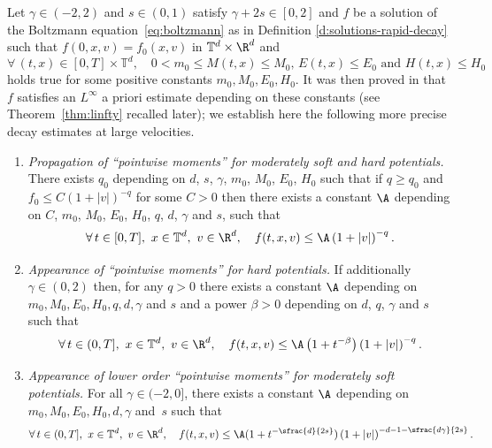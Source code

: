\begin{thm}\label{thm:upper}
Let $\gamma \in (-2,2)$ and $s \in (0,1)$ satisfy
$\gamma +2s \in [0,2]$ and $f$ be a solution of the Boltzmann
equation~\eqref{eq:boltzmann} as in Definition
\ref{d:solutions-rapid-decay} such that $f(0,x,v)=f_0(x,v)$ in $\mathbb{T}^d \times \R^d$ and
\begin{equation}\label{eq:non-deg}
\forall \, (t,x) \in [0,T] \times \mathbb T^d, \quad 0\!<\!m_0\!\le\! M(t,x)\!\le\! M_0, \,
E(t,x)\!\le\! E_0 \text{ and } H(t,x)\!\le\! H_0
\end{equation}
holds true for some positive constants $m_0,M_0,E_0,H_0$. It was then
proved in \cite{luis} that~$f$ satisfies an $L^\infty$ a priori
estimate depending on these constants (see Theorem~\ref{thm:linfty}
recalled later); we establish here the following more precise decay
estimates at large velocities.
\begin{enumerate}
\item \label{i:3} \emph{Propagation of ``pointwise moments'' for
moderately soft and hard potentials.} There exists $q_0$ depending
on $d$, $s$, $\gamma$, $m_0$, $M_0$, $E_0$, $H_0$ such that if
$q \ge q_0$ and $f_0 \le C (1 + |v|)^{-q}$ for some $C>0$ then
there exists a constant $\A$ depending on $C$, $m_0$, $M_0$, $E_0$,
$H_0$, $q$, $d$, $\gamma$ and $s$, such that
\[
\forall \, t \in [0,T], \ x \in \mathbb{T}^d, \ v \in \R^d, \quad
f (t,x,v) \le \A \left(1+|v|\right)^{-q}.
\]

\item \label{i:2} \emph{Appearance of ``pointwise moments'' for hard
potentials.} If additionally $\gamma \in (0,2)$ then, for any
$q>0$ there exists a constant $\A$ depending on
$m_0,M_0,E_0, H_0, q, d, \gamma$ and $s$ and a power $\beta>0$
depending on $d$, $q$, $\gamma$ and $s$ such that
\[
\forall \, t \in (0,T], \ x \in \mathbb{T}^d, \ v \in \R^d, \quad
f(t,x,v) \le \A\left(1+t^{-\beta}\right) \left(1 + |v|\right)^{-q}.
\]

\item \label{i:1} \emph{Appearance of lower order ``pointwise
moments'' for moderately soft potentials.} For all
$\gamma \in (-2,0]$, there exists a constant $\A$ depending on
$m_0,M_0,E_0, H_0, d, \gamma$ and~$s$ such that
\[
\forall \, t \in (0,T], \ x \in \mathbb{T}^d, \ v \in \R^d, \quad
f(t,x,v) \le \A(1+t^{-\sfrac{d}{2s}}) \left( 1 +
|v|\right)^{-d-1-\sfrac{d \gamma}{2s}}.
\]
\end{enumerate}
\end{thm}

